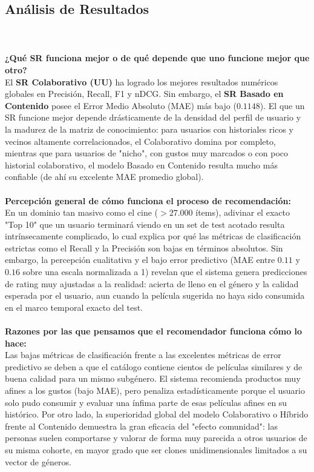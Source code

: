 \documentclass[12pt]{scrartcl}
\begin{document}
\subsection{Análisis de Resultados}
\\\\
\textbf{¿Qué SR funciona mejor o de qué depende que uno funcione mejor que otro?} \\
El \textbf{SR Colaborativo (UU)} ha logrado los mejores resultados numéricos globales en Precisión, Recall, F1 y nDCG. Sin embargo, el \textbf{SR Basado en Contenido} posee el Error Medio Absoluto (MAE) más bajo ($0.1148$). El que un SR funcione mejor depende drásticamente de la densidad del perfil de usuario y la madurez de la matriz de conocimiento: para usuarios con historiales ricos y vecinos altamente correlacionados, el Colaborativo domina por completo, mientras que para usuarios de "nicho", con gustos muy marcados o con poco historial colaborativo, el modelo Basado en Contenido resulta mucho más confiable (de ahí su excelente MAE promedio global).
\\\\
\textbf{Percepción general de cómo funciona el proceso de recomendación:} \\
En un dominio tan masivo como el cine ($>27.000$ ítems), adivinar el exacto "Top 10" que un usuario terminará viendo en un set de test acotado resulta intrínsecamente complicado, lo cual explica por qué las métricas de clasificación estrictas como el Recall y la Precisión son bajas en términos absolutos. Sin embargo, la percepción cualitativa y el bajo error predictivo (MAE entre $0.11$ y $0.16$ sobre una escala normalizada a 1) revelan que el sistema genera predicciones de rating muy ajustadas a la realidad: acierta de lleno en el género y la calidad esperada por el usuario, aun cuando la película sugerida no haya sido consumida en el marco temporal exacto del test.
\\\\
\textbf{Razones por las que pensamos que el recomendador funciona cómo lo hace:} \\
Las bajas métricas de clasificación frente a las excelentes métricas de error predictivo se deben a que el catálogo contiene cientos de películas similares y de buena calidad para un mismo subgénero. El sistema recomienda productos muy afines a los gustos (bajo MAE), pero penaliza estadísticamente porque el usuario solo pudo consumir y evaluar una ínfima parte de esas películas afines en su histórico. Por otro lado, la superioridad global del modelo Colaborativo o Híbrido frente al Contenido demuestra la gran eficacia del "efecto comunidad": las personas suelen comportarse y valorar de forma muy parecida a otros usuarios de su misma cohorte, en mayor grado que ser clones unidimensionales limitados a su vector de géneros.
\end{document}
